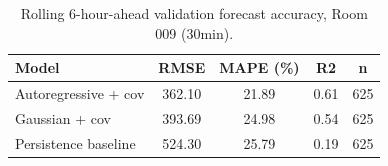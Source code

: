\begin{table}[ht]
\centering
\begin{tabular}{lcccc}
\hline
Model & RMSE & MAPE (\%) & R2 & n \\
\hline
Autoregressive + cov & 362.10 & 21.89 & 0.61 & 625 \\
Gaussian + cov & 393.69 & 24.98 & 0.54 & 625 \\
Persistence baseline & 524.30 & 25.79 & 0.19 & 625 \\
\hline
\end{tabular}
\caption{Rolling 6-hour-ahead validation forecast accuracy, Room 009 (30min).}
\label{tab:week5-validation-forecast}
\end{table}
